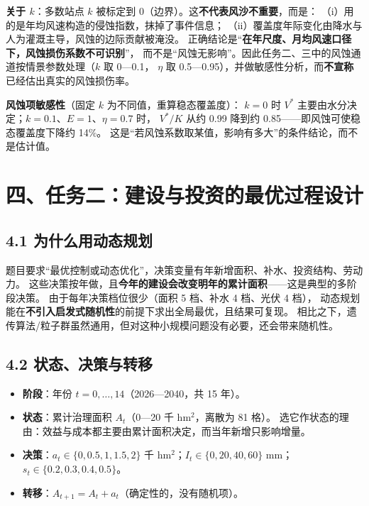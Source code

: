 \documentclass[11pt,a4paper]{ctexart}
\begin{document}
\textbf{关于 $k$}：多数站点 $k$ 被标定到 0（边界）。这\textbf{不代表风沙不重要}，而是：
（i）用的是年均风速构造的侵蚀指数，抹掉了事件信息；
（ii）覆盖度年际变化由降水与人为灌溉主导，风蚀的边际贡献被淹没。
正确结论是“\textbf{在年尺度、月均风速口径下，风蚀损伤系数不可识别}”，
而不是“风蚀无影响”。因此任务二、三中的风蚀通道按情景参数处理（$k$ 取 0—0.1，
$\eta$ 取 0.5—0.95），并做敏感性分析，而\textbf{不宣称}已经估出真实的风蚀损伤率。

\textbf{风蚀项敏感性}（固定 $k$ 为不同值，重算稳态覆盖度）：
$k=0$ 时 $V^*$ 主要由水分决定；$k=0.1$、$E=1$、$\eta=0.7$ 时，
$V^*/K$ 从约 0.99 降到约 0.85——即风蚀可使稳态覆盖度下降约 14\%。
这是“若风蚀系数取某值，影响有多大”的条件结论，而不是估计值。

\section*{四、任务二：建设与投资的最优过程设计}

\subsection*{4.1 为什么用动态规划}
题目要求“最优控制或动态优化”，决策变量有年新增面积、补水、投资结构、劳动力。
这些决策按年做，且\textbf{今年的建设会改变明年的累计面积}——这是典型的多阶段决策。
由于每年决策档位很少（面积 5 档、补水 4 档、光伏 4 档），
动态规划能在\textbf{不引入启发式随机性}的前提下求出全局最优，且结果可复现。
相比之下，遗传算法/粒子群虽然通用，但对这种小规模问题没有必要，还会带来随机性。

\subsection*{4.2 状态、决策与转移}
\begin{itemize}
\item \textbf{阶段}：年份 $t=0,\dots,14$（2026—2040，共 15 年）。
\item \textbf{状态}：累计治理面积 $A_t$（0—20 千 hm$^2$，离散为 81 格）。
选它作状态的理由：效益与成本都主要由累计面积决定，而当年新增只影响增量。
\item \textbf{决策}：$a_t\in\{0,0.5,1,1.5,2\}$ 千 hm$^2$；$I_t\in\{0,20,40,60\}$ mm；
$s_t\in\{0.2,0.3,0.4,0.5\}$。
\item \textbf{转移}：$A_{t+1}=A_t+a_t$（确定性的，没有随机项）。
\end{itemize}
\end{document}
